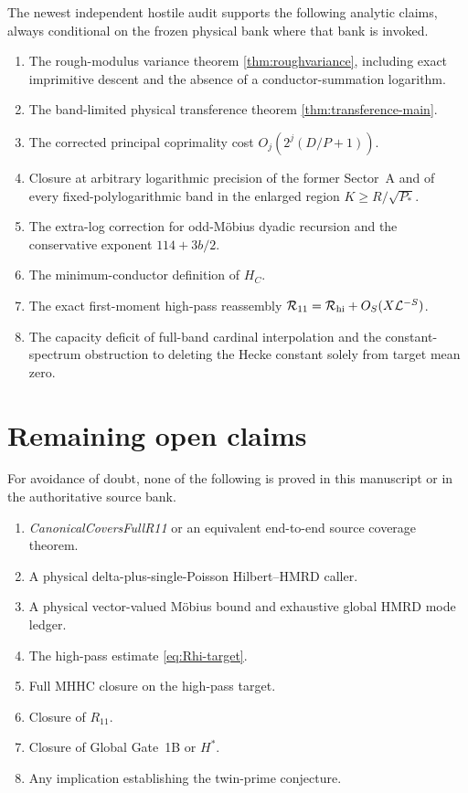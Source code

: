 The newest independent hostile audit supports the following analytic claims,
always conditional on the frozen physical bank where that bank is invoked.
\begin{enumerate}[label=\textup{A\arabic*.},leftmargin=3em]
\item The rough-modulus variance theorem \cref{thm:roughvariance}, including
      exact imprimitive descent and the absence of a conductor-summation
      logarithm.
\item The band-limited physical transference theorem
      \cref{thm:transference-main}.
\item The corrected principal coprimality cost
      $O_j(2^j(D/P+1))$.
\item Closure at arbitrary logarithmic precision of the former Sector~A and of
      every fixed-polylogarithmic band in the enlarged region
      $K\ge R/\sqrt{P_*}$.
\item The extra-log correction for odd-M\"obius dyadic recursion and the
      conservative exponent $114+3b/2$.
\item The minimum-conductor definition of $H_C$.
\item The exact first-moment high-pass reassembly
      $\mathcal R_{11}=\mathcal R_{\mathrm{hi}}+O_S(X\mathcal L^{-S})$.
\item The capacity deficit of full-band cardinal interpolation and the
      constant-spectrum obstruction to deleting the Hecke constant solely from
      target mean zero.
\end{enumerate}

\section{Remaining open claims}\label{app:openclaims}

For avoidance of doubt, none of the following is proved in this manuscript or
in the authoritative source bank.
\begin{enumerate}[label=\textup{O\arabic*.},leftmargin=3em]
\item \emph{CanonicalCoversFullR11} or an equivalent end-to-end source coverage
      theorem.
\item A physical delta-plus-single-Poisson Hilbert--HMRD caller.
\item A physical vector-valued M\"obius bound and exhaustive global HMRD mode
      ledger.
\item The high-pass estimate \cref{eq:Rhi-target}.
\item Full MHHC closure on the high-pass target.
\item Closure of $R_{11}$.
\item Closure of Global Gate~1B or $H^*$.
\item Any implication establishing the twin-prime conjecture.
\end{enumerate}

